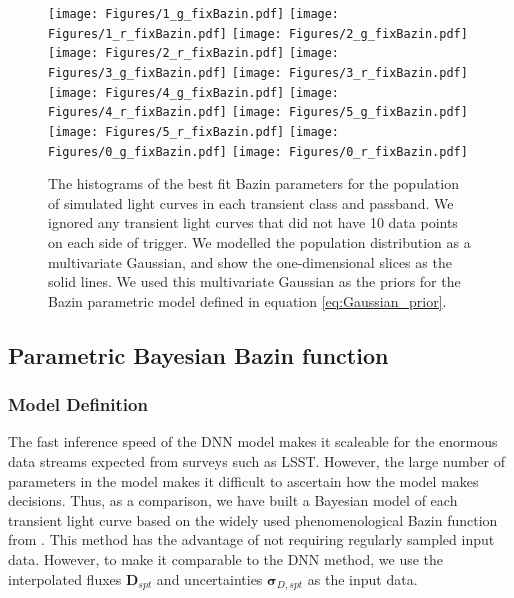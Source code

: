 \documentclass[fleqn,usenatbib]{mnras}
\begin{document}
\begin{figure*}
\centering
    {\texttt{[image: Figures/1\_g\_fixBazin.pdf]}}
    \vspace{-1.5em}
    {\texttt{[image: Figures/1\_r\_fixBazin.pdf]}}
    {\texttt{[image: Figures/2\_g\_fixBazin.pdf]}}
    \vspace{-1.5em}
    {\texttt{[image: Figures/2\_r\_fixBazin.pdf]}}
    {\texttt{[image: Figures/3\_g\_fixBazin.pdf]}}
    \vspace{-1.5em}
    {\texttt{[image: Figures/3\_r\_fixBazin.pdf]}}
    {\texttt{[image: Figures/4\_g\_fixBazin.pdf]}}
    \vspace{-1.5em}
    {\texttt{[image: Figures/4\_r\_fixBazin.pdf]}}
    {\texttt{[image: Figures/5\_g\_fixBazin.pdf]}}
    \vspace{-1.5em}
    {\texttt{[image: Figures/5\_r\_fixBazin.pdf]}}
    {\texttt{[image: Figures/0\_g\_fixBazin.pdf]}}
    {\texttt{[image: Figures/0\_r\_fixBazin.pdf]}}

\caption{The histograms of the best fit Bazin parameters for the population of simulated light curves in each transient class and passband. We ignored any transient light curves that did not have 10 data points on each side of trigger. We modelled the population distribution as a multivariate Gaussian, and show the one-dimensional slices as the solid lines. We used this multivariate Gaussian as the priors for the Bazin parametric model defined in equation \ref{eq:Gaussian_prior}.}
    \label{fig:Bazin_parameter_distribution}
\end{figure*}

\subsection{Parametric Bayesian Bazin function}

\label{sec:Model_Bazin}
\subsubsection{Model Definition}
The fast inference speed of the DNN model makes it scaleable for the enormous data streams expected from surveys such as LSST. However, the large number of parameters in the model makes it difficult to ascertain how the model makes decisions. Thus, as a comparison, we have built a Bayesian model of each transient light curve based on the widely used phenomenological Bazin function from \citet{Bazin_function}. This method has the advantage of not requiring regularly sampled input data. However, to make it comparable to the DNN method, we use the interpolated fluxes $\bm{D}_{spt}$ and uncertainties $\bm{\sigma}_{D,{spt}}$ as the input data.
\end{document}
